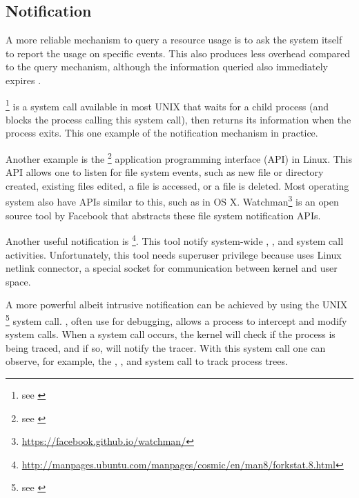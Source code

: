 \subsection{Notification}

A more reliable mechanism to query a resource usage is to ask the system itself to report the usage on specific events.
This also produces less overhead compared to the query mechanism, although the information queried also immediately expires \citep{juvePracticalResourceMonitoring2015}.

\footnote{see \href{https://linux.die.net/man/2/wait4}{}} is a system call available in most UNIX that waits for a child process (and blocks the process calling this system call), then returns its  information when the process exits.
This one example of the notification mechanism in practice.

Another example is the \footnote{see \href{https://linux.die.net/man/7/inotify}{}} application programming interface (API) in Linux.
This API allows one to listen for file system events, such as new file or directory created, existing files edited, a file is accessed, or a file is deleted.
Most operating system also have APIs similar to this, such as  in OS X. Watchman\footnote{\href{https://facebook.github.io/watchman/}{https://facebook.github.io/watchman/}} is an open source tool by Facebook that abstracts these file system notification APIs.

Another useful notification is \footnote{\href{http://manpages.ubuntu.com/manpages/cosmic/en/man8/forkstat.8.html}{http://manpages.ubuntu.com/manpages/cosmic/en/man8/forkstat.8.html}}.
This tool notify system-wide , , and  system call activities.
Unfortunately, this tool needs superuser privilege because uses Linux netlink connector, a special socket for communication between kernel and user space.

A more powerful albeit intrusive notification can be achieved by using the UNIX \footnote{see \href{https://linux.die.net/man/2/ptrace}{}} system call.
, often use for debugging, allows a process to intercept and modify system calls.
When a system call occurs, the kernel will check if the process is being traced, and if so, will notify the tracer.
With this system call one can observe, for example, the , , and  system call to track process trees.


